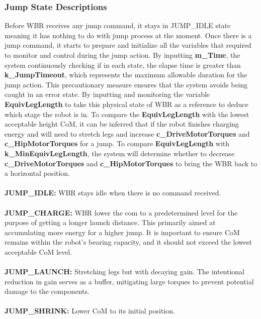 \documentclass[12pt]{article}
\begin{document}
        \subsubsection{Jump State Descriptions}
            Before WBR receives any jump command, it stays in JUMP\_IDLE state meaning it has nothing to do with jump process at the moment. Once there is a jump command, it starts to prepare and initialize all the variables that required to monitor and control during the jump action. By inputting \textbf{m\_Time}, the system continuously checking if in each state, the elapse time is greater than \textbf{k\_JumpTimeout}, which represents the maximum allowable duration for the jump action. This precautionary measure ensures that the system avoids being caught in an error state. By inputting and monitoring the variable \textbf {EquivLegLength} to take this physical state of WBR as a reference to deduce which stage the robot is in. To compare the \textbf {EquivLegLength} with the lowest acceptable height CoM, it can be inferred that if the robot finishes charging energy and will need to stretch legs and increase \textbf{c\_DriveMotorTorques} and \textbf {c\_HipMotorTorques} for a jump. To compare \textbf{EquivLegLength} with \textbf{k\_MinEquivLegLength}, the system will determine whether to decrease \textbf{c\_DriveMotorTorques} and \textbf{c\_HipMotorTorques} to bring the WBR back to a horizontal position.\\\\
            \textbf{JUMP\_IDLE:} WBR stays idle when there is no command received.\\\\
            \textbf{JUMP\_CHARGE:} WBR lower the \acrshort{com} to a predetermined level for the purpose of getting a longer launch distance. This primarily aimed at accumulating more energy for a higher jump. It is important to ensure CoM remains within the robot's bearing capacity, and it should not exceed the lowest acceptable CoM level.\\\\
            \textbf{JUMP\_LAUNCH:} Stretching legs but with decaying gain. The intentional reduction in gain serves as a buffer, mitigating large torques to prevent potential damage to the components.\\\\
            \textbf{JUMP\_SHRINK:} Lower CoM to its initial position.     
\end{document}
